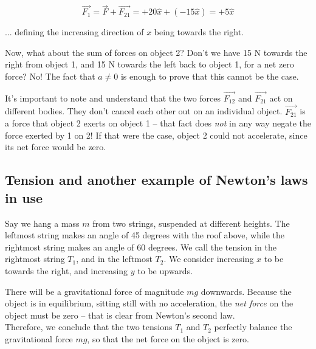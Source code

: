 \begin{equation}
\vec{F_1} = \vec{F} + \vec{F_{21}} = +20\hat{x} + (-15\hat{x}) = +5 \hat{x}
\end{equation}

... defining the increasing direction of $x$ being towards the right.

Now, what about the sum of forces on object 2? Don't we have 15 N towards the right from object 1, and 15 N towards the left back to object 1, for a net zero force? No! The fact that $a \neq 0$ is enough to prove that this cannot be the case.

It's important to note and understand that the two forces $\vec{F_{12}}$ and $\vec{F_{21}}$ act on different bodies. They don't cancel each other out on an individual object. $\vec{F_{21}}$ is a force that object 2 exerts on object 1 -- that fact does \emph{not} in any way negate the force exerted by 1 on 2! If that were the case, object 2 could not accelerate, since its net force would be zero.


\subsection{Tension and another example of Newton's laws in use}

Say we hang a mass $m$ from two strings, suspended at different heights. The leftmost string makes an angle of 45 degrees with the roof above, while the rightmost string makes an angle of 60 degrees. We call the tension in the rightmost string $T_1$, and in the leftmost $T_2$. We consider increasing $x$ to be towards the right, and increasing $y$ to be upwards.

\begin{figure}[H]
     \centering
{}
\end{figure}


There will be a gravitational force of magnitude $m g$ downwards. Because the object is in equilibrium, sitting still with no acceleration, the \emph{net force} on the object must be zero -- that is clear from Newton's second law.\\
Therefore, we conclude that the two tensions $T_1$ and $T_2$ perfectly balance the gravitational force $m g$, so that the net force on the object is zero.

